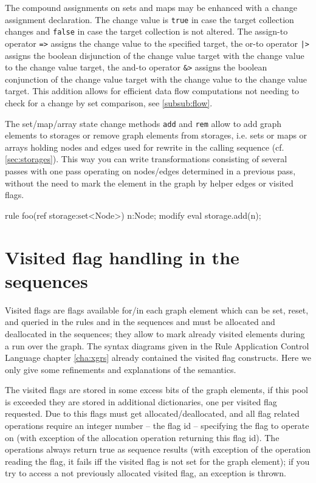 The compound assignments on sets and maps may be enhanced with a change assignment declaration.
The change value is \texttt{true} in case the target collection changes and \texttt{false} in case the target collection is not altered.
The assign-to operator \verb#=># assigns the change value to the specified target, the or-to operator \verb#|># assigns the boolean disjunction of the change value target with the change value to the change value target, the and-to operator \verb#&># assigns the boolean conjunction of the change value target with the change value to the change value target.
This addition allows for efficient data flow computations not needing to check for a change by set comparison, see \ref{subsub:flow}.


\begin{example}
The set/map/array state change methods \texttt{add} and \texttt{rem} allow to add graph elements to storages or remove graph elements from storages, i.e. sets or maps or arrays holding nodes and edges used for rewrite in the calling sequence (cf. \ref{sec:storages}).
This way you can write transformations consisting of several passes with one pass operating on nodes/edges determined in a previous pass,
without the need to mark the element in the graph by helper edges or visited flags.
	\begin{grgen}
rule foo(ref storage:set<Node>)
{
  n:Node;
  modify {
    eval {
      storage.add(n);
    }
  }
}
	\end{grgen}
\end{example}



\section{Visited flag handling in the sequences}\label{sec:visited}

Visited flags are flags available for/in each graph element which can be set, reset, and queried in the rules and in the sequences and must be allocated and deallocated in the sequences;
they allow to mark already visited elements during a run over the graph.
The syntax diagrams given in the Rule Application Control Language chapter \ref{cha:xgrs} already contained the visited flag constructs.
Here we only give some refinements and explanations of the semantics.

The visited flags are stored in some excess bits of the graph elements, if this pool is exceeded they are stored in additional dictionaries, one per visited flag requested.
Due to this flags must get allocated/deallocated, and all flag related operations require an integer number -- the flag id -- specifying the flag to operate on (with exception of the allocation operation returning this flag id).
The operations always return true as sequence results (with exception of the operation reading the flag, it fails iff the visited flag is not set for the graph element);
if you try to access a not previously allocated visited flag, an exception is thrown.

